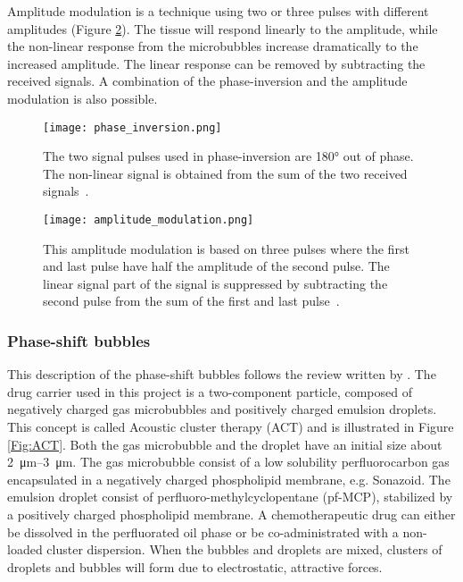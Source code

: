 Amplitude modulation is a technique using two or three pulses with different amplitudes (Figure \ref{Fig:amplitude modulation}). The tissue will respond linearly to the amplitude, while the non-linear response from the microbubbles increase dramatically to the increased amplitude. The linear response can be removed by subtracting the received signals. A combination of the phase-inversion and the amplitude modulation is also possible. 

\begin{figure}[h]
  \centering
  \texttt{[image: phase\_inversion.png]}
  \caption{The two signal pulses used in phase-inversion are \ang{180} out of phase. The non-linear signal is obtained from the sum of the two received signals~\cite{Hoskins2010}.}
  \label{Fig:phase inversion}
\end{figure}
\begin{figure}[h]
	\centering
	\texttt{[image: amplitude\_modulation.png]}
	\caption{This amplitude modulation is based on three pulses where the first and last pulse have half the amplitude of the second pulse. The linear signal part of the signal is suppressed by subtracting the second pulse from the sum of the first and last pulse~\cite{Hoskins2010}.}
	\label{Fig:amplitude modulation}
\end{figure}
\clearpage
\subsubsection{Phase-shift bubbles}
\label{sec:phase-shift bubbles}
This description of the phase-shift bubbles follows the review written by \citet{Healey2013}. The drug carrier used in this project is a two-component particle, composed of negatively charged gas microbubbles and positively charged emulsion droplets. This concept is called Acoustic cluster therapy (ACT\texttrademark{}) and is illustrated in Figure \ref{Fig:ACT}. Both the gas microbubble and the droplet have an initial size about \SIrange{2}{3}{\micro\metre}. The gas microbubble consist of a low solubility perfluorocarbon gas encapsulated in a negatively charged phospholipid membrane, e.g. Sonazoid\texttrademark{}. The emulsion droplet consist of perfluoro-methylcyclopentane (pf-MCP), stabilized by a positively charged phospholipid membrane. A chemotherapeutic drug can either be dissolved in the perfluorated oil phase or be co-administrated with a non-loaded cluster dispersion. When the bubbles and droplets are mixed, clusters of droplets and bubbles will form due to electrostatic, attractive forces.


